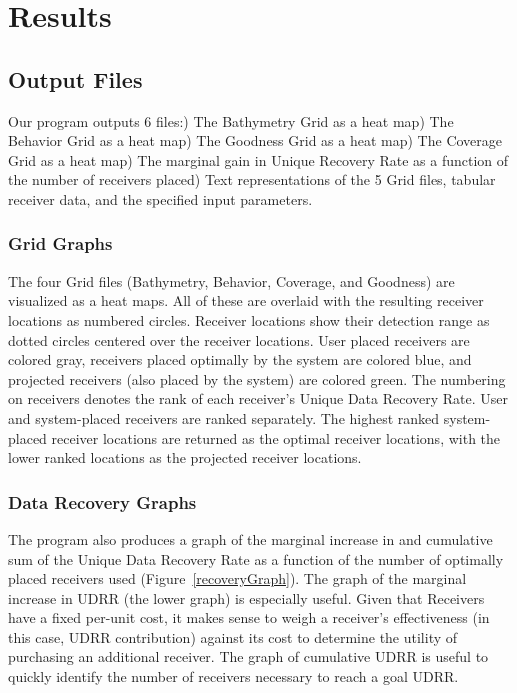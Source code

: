\chapter{Results}
\section{Output Files}
\label{outputFiles}
Our program outputs 6 files:) The Bathymetry Grid as a heat map) The Behavior Grid as a heat map) The Goodness Grid as a heat map) The Coverage Grid as a heat map) The marginal gain in Unique Recovery Rate as a function of the number of receivers placed) Text representations of the 5 Grid files, tabular receiver data, and the specified input parameters.\newline

\subsection{Grid Graphs}
The four Grid files (Bathymetry, Behavior, Coverage, and Goodness) are visualized as a heat maps.  All of these are overlaid with the resulting receiver locations as numbered circles.  Receiver locations show their detection range as dotted circles centered over the receiver locations.  User placed receivers are colored gray, receivers placed optimally by the system are colored blue, and projected receivers (also placed by the system) are colored green.  The numbering on receivers denotes the rank of each receiver's Unique Data Recovery Rate.  User and system-placed receivers are ranked separately.  The highest ranked system-placed receiver locations are returned as the optimal receiver locations, with the lower ranked locations as the projected receiver locations.


\subsection{Data Recovery Graphs}
The program also produces a graph of the marginal increase in and cumulative sum of the Unique Data Recovery Rate as a function of the number of optimally placed receivers used (Figure~\ref{recoveryGraph}).  The graph of the marginal increase in UDRR (the lower graph) is especially useful.  Given that Receivers have a fixed per-unit cost, it makes sense to weigh a receiver's effectiveness (in this case, UDRR contribution) against its cost to determine the utility of purchasing an additional receiver.  The graph of cumulative UDRR is useful to quickly identify the number of receivers necessary to reach a goal UDRR.

